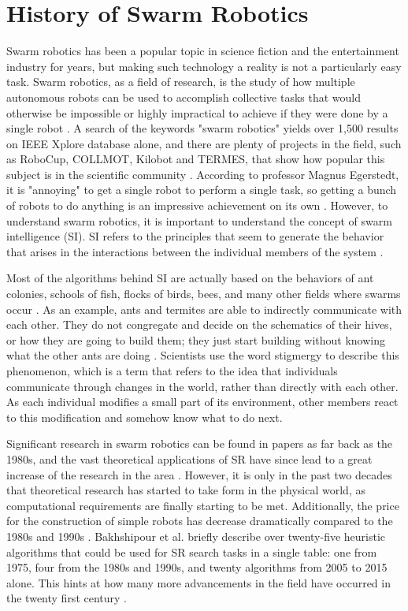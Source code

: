 \documentclass[twocolumn]{bmcart}%
\begin{document}
\section*{History of Swarm Robotics}
Swarm robotics has been a popular topic in science fiction and the entertainment industry for years, but making such technology a reality is not a particularly easy task. Swarm robotics, as a field of research, is the study of how multiple autonomous robots can be used to accomplish collective tasks that would otherwise be impossible or highly impractical to achieve if they were done by a single robot \cite{Bayindir}. A search of the keywords "swarm robotics" yields over 1,500 results on IEEE Xplore database alone, and there are plenty of projects in the field, such as RoboCup, COLLMOT, Kilobot and TERMES, that show how popular this subject is in the scientific community \cite{Vehlken, Mohan}. According to professor Magnus Egerstedt, it is "annoying" to get a single robot to perform a single task, so getting a bunch of robots to do anything is an impressive achievement on its own \cite{TEDx}. However, to understand swarm robotics, it is important to understand the concept of swarm intelligence (SI). SI refers to the principles that seem to generate the behavior that arises in the interactions between the individual members of the system \cite{Bayindir, Mohan, Webb, Couceiro2014}.

Most of the algorithms behind SI are actually based on the behaviors of ant colonies, schools of fish, flocks of birds, bees, and many other fields where swarms occur \cite{Nedjah}. As an example, ants and termites are able to indirectly communicate with each other. They do not congregate and decide on the schematics of their hives, or how they are going to build them; they just start building without knowing what the other ants are doing \cite{TEDx, TEDx2016}. Scientists use the word stigmergy to describe this phenomenon,  which is a term that refers to the idea that individuals communicate through changes in the world, rather than directly with each other. As each individual modifies a small part of its environment, other members react to this modification and somehow know what to do next.  \cite{TEDx2016, SHoR} 

Significant research in swarm robotics can be found in papers as far back as the 1980s, and the vast theoretical applications of SR have since lead to a great increase of the research in the area \cite{Parker}. However, it is only in the past two decades that theoretical research has started to take form in the physical world, as computational requirements are finally starting to be met. Additionally, the price for the construction of simple robots has decrease dramatically compared to the 1980s and 1990s \cite{Bayindir, Mohan}. Bakhshipour et al. briefly describe over twenty-five heuristic algorithms that could be used for SR search tasks in a single table: one from 1975, four from the 1980s and 1990s, and twenty algorithms from 2005 to 2015 alone. This hints at how many more advancements in the field have occurred in the twenty first century \cite{Bakhshipour}.
\end{document}
